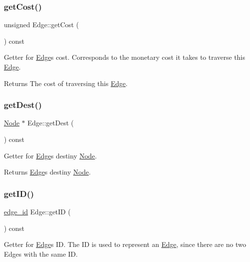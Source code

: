 \subsubsection{\texorpdfstring{get\+Cost()}{getCost()}}
{\footnotesize\ttfamily unsigned Edge\+::get\+Cost (\begin{DoxyParamCaption}{ }\end{DoxyParamCaption}) const}

Getter for \hyperlink{class_edge}{Edge}\textquotesingle{}s cost. Corresponds to the monetary cost it takes to traverse this \hyperlink{class_edge}{Edge}.

\begin{DoxyReturn}{Returns}
The cost of traversing this \hyperlink{class_edge}{Edge}. 
\end{DoxyReturn}
\hypertarget{class_edge_af2cd0f7cba34228f76c4b20a84a2de9d}{}\label{class_edge_af2cd0f7cba34228f76c4b20a84a2de9d} 
\subsubsection{\texorpdfstring{get\+Dest()}{getDest()}}
{\footnotesize\ttfamily \hyperlink{class_node}{Node} $\ast$ Edge\+::get\+Dest (\begin{DoxyParamCaption}{ }\end{DoxyParamCaption}) const}

Getter for \hyperlink{class_edge}{Edge}\textquotesingle{}s destiny \hyperlink{class_node}{Node}.

\begin{DoxyReturn}{Returns}
\hyperlink{class_edge}{Edge}\textquotesingle{}s destiny \hyperlink{class_node}{Node}. 
\end{DoxyReturn}
\hypertarget{class_edge_afb88989f2a1b21bdd1d5aaa4054486c3}{}\label{class_edge_afb88989f2a1b21bdd1d5aaa4054486c3} 
\subsubsection{\texorpdfstring{get\+I\+D()}{getID()}}
{\footnotesize\ttfamily \hyperlink{_edge_8hpp_ad7d18d7b90a45b6625704e92d10aa3a0}{edge\+\_\+id} Edge\+::get\+ID (\begin{DoxyParamCaption}{ }\end{DoxyParamCaption}) const}

Getter for \hyperlink{class_edge}{Edge}\textquotesingle{}s ID. The ID is used to represent an \hyperlink{class_edge}{Edge}, since there are no two Edges with the same ID.

